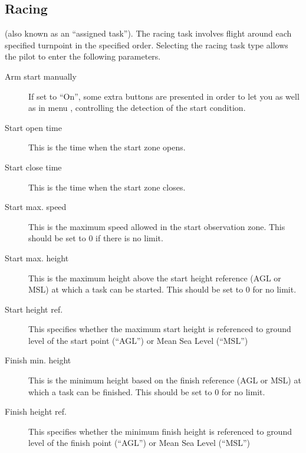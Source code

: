 \subsection*{Racing}
(also known as an ``assigned task'').  The racing task involves flight
around each specified turnpoint in the specified order.  Selecting the racing task 
type allows the pilot to enter the following parameters.
  \begin{description}
  \item [Arm start manually] If set to ``On'', some extra buttons are presented 
  in order to let you  as well as  in 
  menu , controlling  the detection of the start condition.
  \item [Start open time] This is the time when the start zone opens.
  \item [Start close time] This is the time when the start zone closes.
  \item [Start max. speed] This is the maximum speed allowed in the start observation 
    zone.  This should be set to 0 if there is no limit.
  \item [Start max. height] This is the maximum height above the start height 
    reference (AGL or MSL) at which a task can be started.  This  should be set to 
    0 for no limit.
  \item [Start height ref.] This specifies whether the maximum start height is 
    referenced to ground level of the start point (``AGL'') or Mean Sea Level (``MSL'')
  \item [Finish min. height] This is the minimum height based on the finish 
    reference (AGL or MSL) at which a task can be finished.  This should be set to 
    0 for no limit.
  \item [Finish height ref.] This specifies whether the minimum finish height 
    is referenced to ground level of the finish point (``AGL'') or Mean Sea Level (``MSL'')
  \end{description}
  
